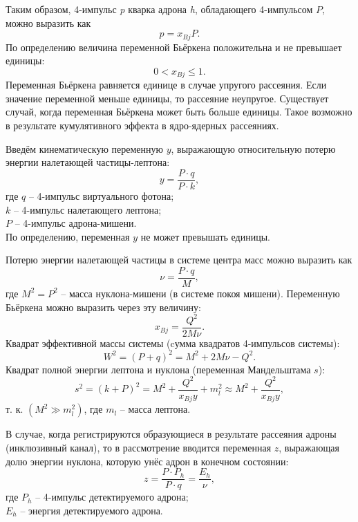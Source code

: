 \documentclass{extreport}
\begin{document}
Таким образом, 4-импульс \textit{p} кварка адрона \textit{h}, обладающего 4-импульсом $P$, можно выразить как
\begin{equation}
    p=x_{Bj}P.
\end{equation}
По определению величина переменной Бьёркена положительна и не превышает единицы: 
\begin{equation}
    0 < x_{Bj} \leq 1.
\end{equation}
Переменная Бьёркена равняется единице в случае упругого рассеяния. Если значение переменной меньше единицы, то рассеяние неупругое. Существует случай, когда переменная Бьёркена может быть больше единицы. Такое возможно в результате кумулятивного эффекта в ядро-ядерных рассеяниях.

Введём кинематическую переменную $y$, выражающую относительную потерю энергии налетающей частицы-лептона:
\begin{equation}
    y = \frac{P \cdot q}{P \cdot k},
\end{equation}
где $q$ -- 4-импульс виртуального фотона; \\ $k$ -- 4-импульс налетающего лептона; \\ $P$ -- 4-импульс адрона-мишени. \\ По определению, переменная $y$ не может превышать единицы.

Потерю энергии налетающей частицы в системе центра масс можно выразить как 
\begin{equation}
    \nu = \frac{P \cdot q}{M},
\end{equation}
где $M^2 = P^2$ -- масса нуклона-мишени (в системе покоя мишени). Переменную Бьёркена можно выразить через эту величину:
\begin{equation}
    x_{Bj} = \frac{Q^2}{2M\nu}.
\end{equation}
Квадрат эффективной массы системы (cумма квадратов 4-импульсов системы):
\begin{equation}
	W^2 = (P+q)^2 = M^2 + 2M\nu - Q^2.
\end{equation}
Квадрат полной энергии лептона и нуклона (переменная Мандельштама $s$):
\begin{equation}
	s^2 = (k+P)^2 = M^2 + \frac{Q^2}{x_{Bj}y} + m_l^2 \approx M^2 + \frac{Q^2}{x_{Bj}y}, 
\end{equation}
т. к. $(M^2 \gg m_l^2)$, где $m_l$ -- масса лептона. 

В случае, когда регистрируются образующиеся в результате рассеяния адроны (инклюзивный канал), то в рассмотрение вводится переменная $z$, выражающая долю энергии нуклона, которую унёс адрон в конечном состоянии:
\begin{equation}
	\label{eq:z}
	z = \frac{P \cdot P_h}{P \cdot q} = \frac{E_h}{\nu},
\end{equation}
где $P_h$ -- 4-импульс детектируемого адрона; \\ $E_h$ -- энергия детектируемого адрона. 
\end{document}
